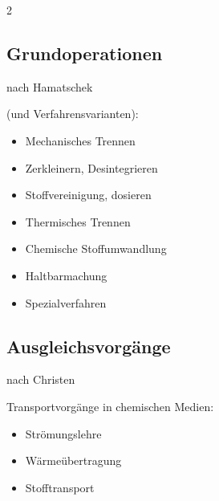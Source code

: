 \documentclass[a4paper,10pt]{article}
\begin{document}
\begin{multicols}{2}
\subsection{Grundoperationen}
\begin{flushright}
nach Hamatschek
\end{flushright}
(und Verfahrensvarianten):
\begin{itemize}
\item Mechanisches Trennen
\item Zerkleinern, Desintegrieren
\item Stoffvereinigung, dosieren
\item Thermisches Trennen
\item Chemische Stoffumwandlung
\item Haltbarmachung
\item Spezialverfahren
\end{itemize}

\subsection{Ausgleichsvorgänge}
\begin{flushright}
nach Christen
\end{flushright}
Transportvorgänge in chemischen Medien:
\begin{itemize}
\item Strömungslehre
\item Wärmeübertragung
\item Stofftransport
\end{itemize}
\vspace*{1cm}
\end{multicols}


\pagebreak
\end{document}
